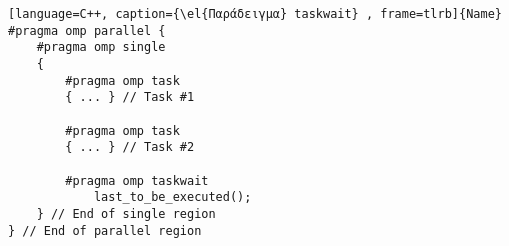 \begin{spacing}{1.0}
\begin{lstlisting}[language=C++, caption={\el{Παράδειγμα} taskwait} , frame=tlrb]{Name}
#pragma omp parallel {
	#pragma omp single
	{
		#pragma omp task
		{ ... } // Task #1

		#pragma omp task
		{ ... } // Task #2

		#pragma omp taskwait
			last_to_be_executed();
	} // End of single region
} // End of parallel region
\end{lstlisting}
\end{spacing}
